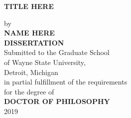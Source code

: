 \setcounter{page}{1} 
\thispagestyle{empty}
\begin{titlepage}


	\begin{center}

	\singlespacing
	\textbf{TITLE HERE}\\
	\doublespacing
	
	by\\
	
	\textbf{NAME HERE}\\
	\textbf{DISSERTATION}\\
	

	
	
	
	Submitted to the Graduate School\\
	
        of Wayne State University,\\
        Detroit, Michigan\\
	in partial fulfillment of the requirements\\
	for the degree of\\
	\textbf{DOCTOR OF PHILOSOPHY}\\

	2019\\
	\end{center}
	\begin{flushright}
	\\
   \vspace{1.0cm}
	 \\
   \vspace{0.7cm}
	\makebox[8.7cm][l]{$\overline {\hspace{7.8cm}}$} \\
   \vspace{0.9cm}
	\makebox[8.7cm][l]{$\overline {\hspace{7.8cm}}$} \\
   \vspace{0.9cm}
	\makebox[8.7cm][l]{$\overline {\hspace{7.8cm}}$} \\
	
	\end{flushright}

	\end{titlepage}
